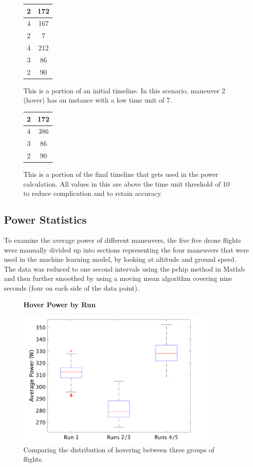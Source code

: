 \documentclass{article}
\begin{document}
\begin{figure}[!htb]
\centering
{}
	\centering
	\begin{tabular}{|c|c|}
	\hline
	2&172\\
	\hline
	4&167\\
	\hline
	2&7\\
	\hline
	4&212\\
	\hline
	3&86\\
	\hline
	2&90\\
	\hline
	\end{tabular}
	\caption{This is a portion of an initial timeline. In this scenario, maneuver 2 (hover) has an instance with a low time unit of 7.}
	\label{fig:original}
\endminipage\hfill
{}
	\centering
	\begin{tabular}{|c|c|}
	\hline
	2&172\\
	\hline
	4&386\\
	\hline
	3&86\\
	\hline
	2&90\\
	\hline
	\end{tabular}
	\caption{This is a portion of the final timeline that gets used in the power calculation. All values in this are above the time unit threshold of 10 to reduce complication and to retain accuracy.}
	\label{fig:fixed}
\endminipage\hfill
\end{figure}


\subsection{Power Statistics}
To examine the average power of different maneuvers, the five five drone flights were manually divided up into sections representing the four maneuvers that were used in the machine learning model, by looking at altitude and ground speed. The data was reduced to one second intervals using the pchip method in Matlab and then further smoothed by using a moving mean algorithm covering nine seconds (four on each side of the data point).\par

\begin{figure}[!h]
  \centering
  \large{\textbf{Hover Power by Run}}\par
  \includegraphics[width = 100mm]{images/HoverPlain.png}
  \caption{Comparing the distribution of hovering between three groups of flights.}
  \label{fig:hover}
\end{figure}
\end{document}
